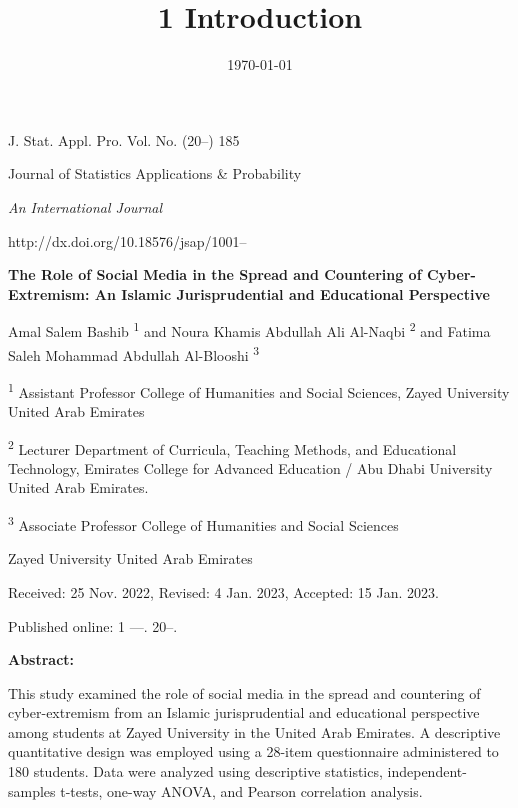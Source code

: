 \documentclass[11pt,a4paper]{article}
\title{1 Introduction}
\date{\today}
\begin{document}
	\maketitle
	
	\begin{figure}[h]
		\centering
	\end{figure}
	
	J. Stat. Appl. Pro. Vol.   No.     (20--)	185
	
	Journal of Statistics Applications \& Probability
	
	\textit{An International Journal	}
	
	http://dx.doi.org/10.18576/jsap/1001--
	
	\textbf{The Role of Social Media in the Spread and Countering of Cyber-Extremism: An Islamic Jurisprudential and Educational Perspective}
	
	Amal Salem Bashib\textsuperscript{ 1} and Noura Khamis Abdullah Ali Al-Naqbi\textsuperscript{ 2} and Fatima Saleh Mohammad Abdullah Al-Blooshi\textsuperscript{ 3}
	
	\textsuperscript{1 }Assistant Professor College of Humanities and Social Sciences, Zayed University United Arab Emirates
	
	\textsuperscript{2} Lecturer  Department of Curricula, Teaching Methods, and Educational Technology, Emirates College for Advanced Education / Abu Dhabi University United Arab Emirates.
	
	\textsuperscript{3} Associate Professor College of Humanities and Social Sciences
	
	Zayed University United Arab Emirates
	
	Received: 25 Nov. 2022, Revised: 4 Jan. 2023, Accepted: 15 Jan. 2023.
	
	Published online: 1 ---. 20--.
	
	\textbf{Abstract:}
	
	This study examined the role of social media in the spread and countering of cyber-extremism from an Islamic jurisprudential and educational perspective among students at Zayed University in the United Arab Emirates. A descriptive quantitative design was employed using a 28-item questionnaire administered to 180 students. Data were analyzed using descriptive statistics, independent-samples t-tests, one-way ANOVA, and Pearson correlation analysis.
	
\end{document}
